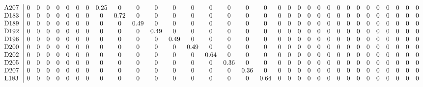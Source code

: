 \begin{table}[H]
\begin{center}
\begin{math}
\begin{array}{c|cccccccccccccccccccccccccccccccc}
\mathrm{A207} \hspace*{2pt} &  0 &  0 &  0 &  0 &  0 &  0 &  0 &       0.25 &  0 &  0 &  0 &  0 &  0 &  0 &  0 &  0 &  0 &  0 &  0 &  0 &  0 &  0 &  0 &  0 &  0 &  0 &  0 &  0 &  0 &  0 &  0 &  0 \\
\mathrm{D183} \hspace*{2pt} &  0 &  0 &  0 &  0 &  0 &  0 &  0 &  0 &       0.72 &  0 &  0 &  0 &  0 &  0 &  0 &  0 &  0 &  0 &  0 &  0 &  0 &  0 &  0 &  0 &  0 &  0 &  0 &  0 &  0 &  0 &  0 &  0 \\
\mathrm{D189} \hspace*{2pt} &  0 &  0 &  0 &  0 &  0 &  0 &  0 &  0 &  0 &       0.49 &  0 &  0 &  0 &  0 &  0 &  0 &  0 &  0 &  0 &  0 &  0 &  0 &  0 &  0 &  0 &  0 &  0 &  0 &  0 &  0 &  0 &  0 \\
\mathrm{D192} \hspace*{2pt} &  0 &  0 &  0 &  0 &  0 &  0 &  0 &  0 &  0 &  0 &       0.49 &  0 &  0 &  0 &  0 &  0 &  0 &  0 &  0 &  0 &  0 &  0 &  0 &  0 &  0 &  0 &  0 &  0 &  0 &  0 &  0 &  0 \\
\mathrm{D196} \hspace*{2pt} &  0 &  0 &  0 &  0 &  0 &  0 &  0 &  0 &  0 &  0 &  0 &       0.49 &  0 &  0 &  0 &  0 &  0 &  0 &  0 &  0 &  0 &  0 &  0 &  0 &  0 &  0 &  0 &  0 &  0 &  0 &  0 &  0 \\
\mathrm{D200} \hspace*{2pt} &  0 &  0 &  0 &  0 &  0 &  0 &  0 &  0 &  0 &  0 &  0 &  0 &       0.49 &  0 &  0 &  0 &  0 &  0 &  0 &  0 &  0 &  0 &  0 &  0 &  0 &  0 &  0 &  0 &  0 &  0 &  0 &  0 \\
\mathrm{D202} \hspace*{2pt} &  0 &  0 &  0 &  0 &  0 &  0 &  0 &  0 &  0 &  0 &  0 &  0 &  0 &       0.64 &  0 &  0 &  0 &  0 &  0 &  0 &  0 &  0 &  0 &  0 &  0 &  0 &  0 &  0 &  0 &  0 &  0 &  0 \\
\mathrm{D205} \hspace*{2pt} &  0 &  0 &  0 &  0 &  0 &  0 &  0 &  0 &  0 &  0 &  0 &  0 &  0 &  0 &       0.36 &  0 &  0 &  0 &  0 &  0 &  0 &  0 &  0 &  0 &  0 &  0 &  0 &  0 &  0 &  0 &  0 &  0 \\
\mathrm{D207} \hspace*{2pt} &  0 &  0 &  0 &  0 &  0 &  0 &  0 &  0 &  0 &  0 &  0 &  0 &  0 &  0 &  0 &       0.36 &  0 &  0 &  0 &  0 &  0 &  0 &  0 &  0 &  0 &  0 &  0 &  0 &  0 &  0 &  0 &  0 \\
\mathrm{L183} \hspace*{2pt} &  0 &  0 &  0 &  0 &  0 &  0 &  0 &  0 &  0 &  0 &  0 &  0 &  0 &  0 &  0 &  0 &       0.64 &  0 &  0 &  0 &  0 &  0 &  0 &  0 &  0 &  0 &  0 &  0 &  0 &  0 &  0 &  0 \\

\end{array}
\end{math}
\end{center}
\end{table}
